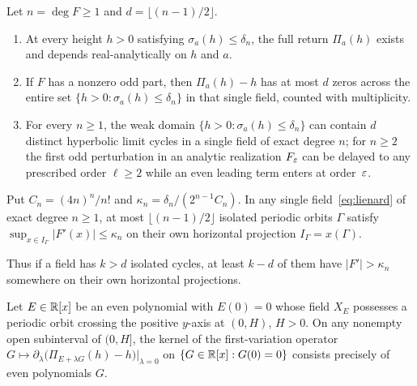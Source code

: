 \begin{theorem}\label{thm:weak}
Let $n=\deg F\ge 1$ and $d=\lfloor(n-1)/2\rfloor$.
\begin{enumerate}
  \item[\textup{(i)}] At every height $h>0$ satisfying $\sigma_a(h)\le\delta_n$, the full return $\Pi_a(h)$ exists and depends real-analytically on $h$ and $a$.
  \item[\textup{(ii)}] If $F$ has a nonzero odd part, then $\Pi_a(h)-h$ has at most $d$ zeros across the entire set $\{h>0:\sigma_a(h)\le\delta_n\}$ in that single field, counted with multiplicity.
  \item[\textup{(iii)}] For every $n\ge 1$, the weak domain $\{h>0:\sigma_a(h)\le\delta_n\}$ can contain $d$ distinct hyperbolic limit cycles in a single field of exact degree $n$; for $n\ge 2$ the first odd perturbation in an analytic realization $F_\varepsilon$ can be delayed to any prescribed order $\ell\ge 2$ while an even leading term enters at order~$\varepsilon$.
\end{enumerate}
\end{theorem}

\begin{corollary}\label{cor:intrinsic}
Put $C_n=(4n)^n/n!$ and $\kappa_n=\delta_n/(2^{n-1}C_n)$. In any single field~\eqref{eq:lienard} of exact degree $n\ge 1$, at most $\lfloor(n-1)/2\rfloor$ isolated periodic orbits $\Gamma$ satisfy $\sup_{x\in I_\Gamma}|F'(x)|\le\kappa_n$ on their own horizontal projection $I_\Gamma=x(\Gamma)$.
\end{corollary}

\noindent Thus if a field has $k>d$ isolated cycles, at least $k-d$ of
them have $|F'|>\kappa_n$ somewhere on their own horizontal projections.

\begin{lemma}\label{prop:center-kernel}
Let $E\in\mathbb{R}[x]$ be an even polynomial with $E(0)=0$ whose field $X_E$ possesses a periodic orbit crossing the positive $y$-axis at $(0,H)$, $H>0$. On any nonempty open subinterval of $(0,H]$, the kernel of the first-variation operator $G\mapsto \partial_\lambda\big(\Pi_{E+\lambda G}(h)-h\big)\big|_{\lambda=0}$ on $\{G\in\mathbb{R}[x]:G(0)=0\}$ consists precisely of even polynomials $G$.
\end{lemma}
